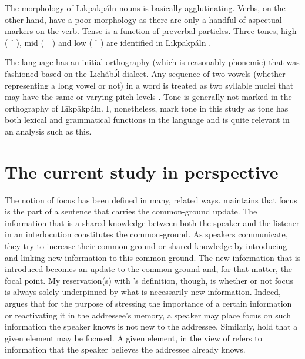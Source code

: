 \documentclass[output=paper,colorlinks,citecolor=brown]{langscibook}
\begin{document}
The morphology of Līkpākpáln nouns is basically agglutinating. Verbs, on the other hand, have a poor morphology as there are only a handful of aspectual markers on the verb. Tense is a function of preverbal particles. Three tones, high ( ˊ ), mid ( ˉ ) and low ( ˋ ) are identified in Līkpākpáln \citep[16]{SteeleWeed1966}.

The language has an initial orthography (which is reasonably phonemic) that was fashioned based on the Līchábͻ́l dialect. Any sequence of two vowels (whether representing a long vowel or not) in a word is treated as two syllable nuclei that may have the same or varying pitch levels \citep{BisilkiAkpanglo-Nartey2017}. Tone is generally not marked in the orthography of Līkpākpáln. I, nonetheless, mark tone in this study as tone has both lexical and grammatical functions in the language and is quite relevant in an analysis such as this.

\section{The current study in perspective}\label{sec:bisilki:3}

The notion of focus has been defined in many, related ways. \Textcite[92]{VanPutten2016} maintains that focus is the part of a sentence that carries the common-ground update. The information that is a shared knowledge between both the speaker and the listener in an interlocution constitutes the common-ground. As speakers communicate, they try to increase their common-ground or shared knowledge by introducing and linking new information to this common ground. The new information that is introduced becomes an update to the common-ground and, for that matter, the focal point. My reservation(s) with \citeauthor{VanPutten2016}’s definition, though, is whether or not focus is always solely underpinned by what is necessarily new information. Indeed, \citet[59]{Dik1981} argues that for the purpose of stressing the importance of a certain information or reactivating it in the addressee’s memory, a speaker may place focus on such information the speaker knows is not new to the addressee. Similarly, \citet[3]{SkopeteasEtAl2006} hold that a given element may be focused. A given element, in the view of \citet[2]{SkopeteasEtAl2006} refers to information that the speaker believes the addressee already knows.
\end{document}
